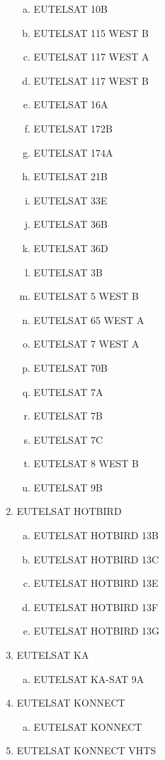 \begin{multicols}{2}
\begin{enumerate}
\begin{enumerate}[a.]
    \item EUTELSAT 10B
    \item EUTELSAT 115 WEST B
    \item EUTELSAT 117 WEST A
    \item EUTELSAT 117 WEST B
    \item EUTELSAT 16A
    \item EUTELSAT 172B
    \item EUTELSAT 174A
    \item EUTELSAT 21B
    \item EUTELSAT 33E
    \item EUTELSAT 36B
    \item EUTELSAT 36D
    \item EUTELSAT 3B
    \item EUTELSAT 5 WEST B
    \item EUTELSAT 65 WEST A
    \item EUTELSAT 7 WEST A
    \item EUTELSAT 70B
    \item EUTELSAT 7A
    \item EUTELSAT 7B
    \item EUTELSAT 7C
    \item EUTELSAT 8 WEST B
    \item EUTELSAT 9B
  \end{enumerate}
  \item EUTELSAT HOTBIRD
  \begin{enumerate}[a.]
    \item EUTELSAT HOTBIRD 13B
    \item EUTELSAT HOTBIRD 13C
    \item EUTELSAT HOTBIRD 13E
    \item EUTELSAT HOTBIRD 13F
    \item EUTELSAT HOTBIRD 13G
  \end{enumerate}
  \item EUTELSAT KA
  \begin{enumerate}[a.]
    \item EUTELSAT KA-SAT 9A
  \end{enumerate}
  \item EUTELSAT KONNECT
  \begin{enumerate}[a.]
    \item EUTELSAT KONNECT
  \end{enumerate}
  \item EUTELSAT KONNECT VHTS
  \begin{enumerate}[a.]

\end{enumerate}
\end{enumerate}
\end{multicols}
